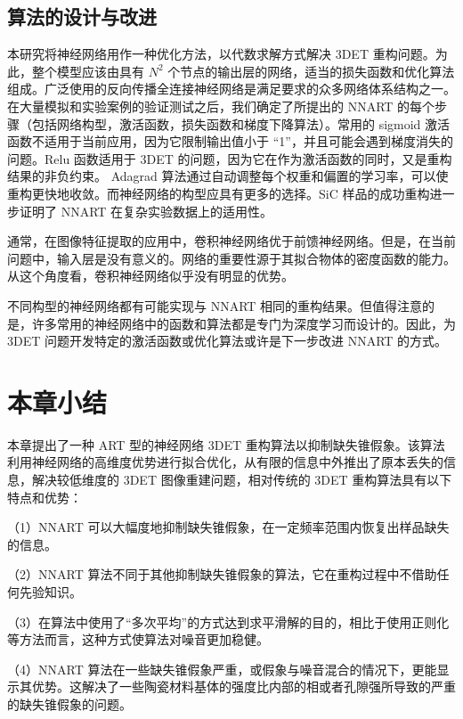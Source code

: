 \subsection{算法的设计与改进}

本研究将神经网络用作一种优化方法，以代数求解方式解决 3DET 重构问题。为此，整个模型应该由具有 $N^2$ 个节点的输出层的网络，适当的损失函数和优化算法组成。广泛使用的反向传播全连接神经网络是满足要求的众多网络体系结构之一。在大量模拟和实验案例的验证测试之后，我们确定了所提出的 NNART 的每个步骤（包括网络构型，激活函数，损失函数和梯度下降算法）。常用的 sigmoid 激活函数不适用于当前应用，因为它限制输出值小于 “1”，并且可能会遇到梯度消失的问题。Relu 函数适用于 3DET 的问题，因为它在作为激活函数的同时，又是重构结果的非负约束。 Adagrad 算法通过自动调整每个权重和偏置的学习率，可以使重构更快地收敛。而神经网络的构型应具有更多的选择。SiC 样品的成功重构进一步证明了 NNART 在复杂实验数据上的适用性。

通常，在图像特征提取的应用中，卷积神经网络优于前馈神经网络。但是，在当前问题中，输入层是没有意义的。网络的重要性源于其拟合物体的密度函数的能力。从这个角度看，卷积神经网络似乎没有明显的优势。

不同构型的神经网络都有可能实现与 NNART 相同的重构结果。但值得注意的是，许多常用的神经网络中的函数和算法都是专门为深度学习而设计的。因此，为 3DET 问题开发特定的激活函数或优化算法或许是下一步改进 NNART 的方式。

\section{本章小结}
本章提出了一种 ART 型的神经网络 3DET 重构算法以抑制缺失锥假象。该算法利用神经网络的高维度优势进行拟合优化，从有限的信息中外推出了原本丢失的信息，解决较低维度的 3DET 图像重建问题，相对传统的 3DET 重构算法具有以下特点和优势：

（1）NNART 可以大幅度地抑制缺失锥假象，在一定频率范围内恢复出样品缺失的信息。

（2）NNART 算法不同于其他抑制缺失锥假象的算法，它在重构过程中不借助任何先验知识。

（3）在算法中使用了“多次平均”的方式达到求平滑解的目的，相比于使用正则化等方法而言，这种方式使算法对噪音更加稳健。

（4）NNART 算法在一些缺失锥假象严重，或假象与噪音混合的情况下，更能显示其优势。这解决了一些陶瓷材料基体的强度比内部的相或者孔隙强所导致的严重的缺失锥假象的问题。
